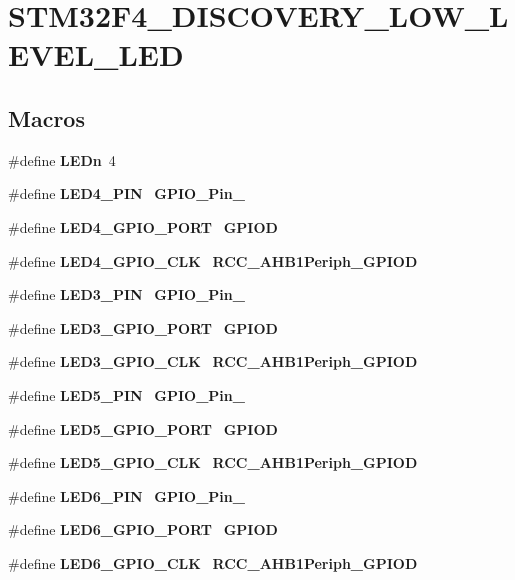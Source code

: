 \section{S\+T\+M32\+F4\+\_\+\+D\+I\+S\+C\+O\+V\+E\+R\+Y\+\_\+\+L\+O\+W\+\_\+\+L\+E\+V\+E\+L\+\_\+\+L\+ED}
\label{group__STM32F4__DISCOVERY__LOW__LEVEL__LED}
\subsection*{Macros}
\begin{DoxyCompactItemize}
\item 
\#define \textbf{ L\+E\+Dn}~4
\item 
\#define \textbf{ L\+E\+D4\+\_\+\+P\+IN}~\textbf{ G\+P\+I\+O\+\_\+\+Pin\+\_}
\item 
\#define \textbf{ L\+E\+D4\+\_\+\+G\+P\+I\+O\+\_\+\+P\+O\+RT}~\textbf{ G\+P\+I\+OD}
\item 
\#define \textbf{ L\+E\+D4\+\_\+\+G\+P\+I\+O\+\_\+\+C\+LK}~\textbf{ R\+C\+C\+\_\+\+A\+H\+B1\+Periph\+\_\+\+G\+P\+I\+OD}
\item 
\#define \textbf{ L\+E\+D3\+\_\+\+P\+IN}~\textbf{ G\+P\+I\+O\+\_\+\+Pin\+\_}
\item 
\#define \textbf{ L\+E\+D3\+\_\+\+G\+P\+I\+O\+\_\+\+P\+O\+RT}~\textbf{ G\+P\+I\+OD}
\item 
\#define \textbf{ L\+E\+D3\+\_\+\+G\+P\+I\+O\+\_\+\+C\+LK}~\textbf{ R\+C\+C\+\_\+\+A\+H\+B1\+Periph\+\_\+\+G\+P\+I\+OD}
\item 
\#define \textbf{ L\+E\+D5\+\_\+\+P\+IN}~\textbf{ G\+P\+I\+O\+\_\+\+Pin\+\_}
\item 
\#define \textbf{ L\+E\+D5\+\_\+\+G\+P\+I\+O\+\_\+\+P\+O\+RT}~\textbf{ G\+P\+I\+OD}
\item 
\#define \textbf{ L\+E\+D5\+\_\+\+G\+P\+I\+O\+\_\+\+C\+LK}~\textbf{ R\+C\+C\+\_\+\+A\+H\+B1\+Periph\+\_\+\+G\+P\+I\+OD}
\item 
\#define \textbf{ L\+E\+D6\+\_\+\+P\+IN}~\textbf{ G\+P\+I\+O\+\_\+\+Pin\+\_}
\item 
\#define \textbf{ L\+E\+D6\+\_\+\+G\+P\+I\+O\+\_\+\+P\+O\+RT}~\textbf{ G\+P\+I\+OD}
\item 
\#define \textbf{ L\+E\+D6\+\_\+\+G\+P\+I\+O\+\_\+\+C\+LK}~\textbf{ R\+C\+C\+\_\+\+A\+H\+B1\+Periph\+\_\+\+G\+P\+I\+OD}
\end{DoxyCompactItemize}



